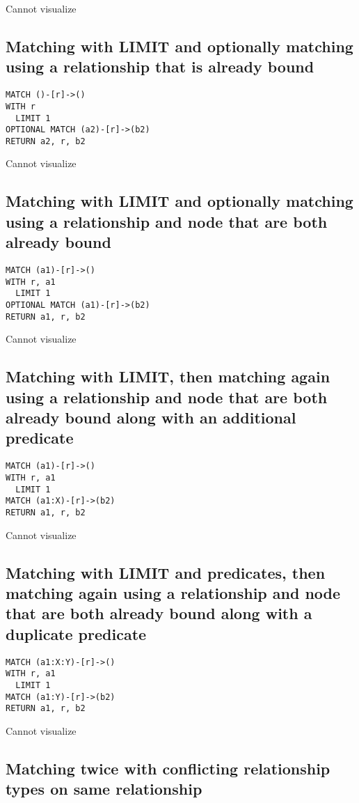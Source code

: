 Cannot visualize
\subsection{Matching with LIMIT and optionally matching using a relationship that is already bound}

\begin{lstlisting}
MATCH ()-[r]->()
WITH r
  LIMIT 1
OPTIONAL MATCH (a2)-[r]->(b2)
RETURN a2, r, b2
\end{lstlisting}

Cannot visualize
\subsection{Matching with LIMIT and optionally matching using a relationship and node that are both already bound}

\begin{lstlisting}
MATCH (a1)-[r]->()
WITH r, a1
  LIMIT 1
OPTIONAL MATCH (a1)-[r]->(b2)
RETURN a1, r, b2
\end{lstlisting}

Cannot visualize
\subsection{Matching with LIMIT, then matching again using a relationship and node that are both already bound along with an additional predicate}

\begin{lstlisting}
MATCH (a1)-[r]->()
WITH r, a1
  LIMIT 1
MATCH (a1:X)-[r]->(b2)
RETURN a1, r, b2
\end{lstlisting}

Cannot visualize
\subsection{Matching with LIMIT and predicates, then matching again using a relationship and node that are both already bound along with a duplicate predicate}

\begin{lstlisting}
MATCH (a1:X:Y)-[r]->()
WITH r, a1
  LIMIT 1
MATCH (a1:Y)-[r]->(b2)
RETURN a1, r, b2
\end{lstlisting}

Cannot visualize
\subsection{Matching twice with conflicting relationship types on same relationship}

